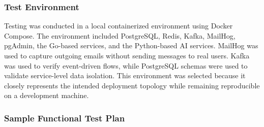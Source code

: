 \subsubsection{Test Environment}
Testing was conducted in a local containerized environment using Docker Compose. The environment included PostgreSQL, Redis, Kafka, MailHog, pgAdmin, the Go-based services, and the Python-based AI services. MailHog was used to capture outgoing emails without sending messages to real users. Kafka was used to verify event-driven flows, while PostgreSQL schemas were used to validate service-level data isolation. This environment was selected because it closely represents the intended deployment topology while remaining reproducible on a development machine.

\subsubsection{Sample Functional Test Plan}
\renewcommand{\arraystretch}{1.25}

